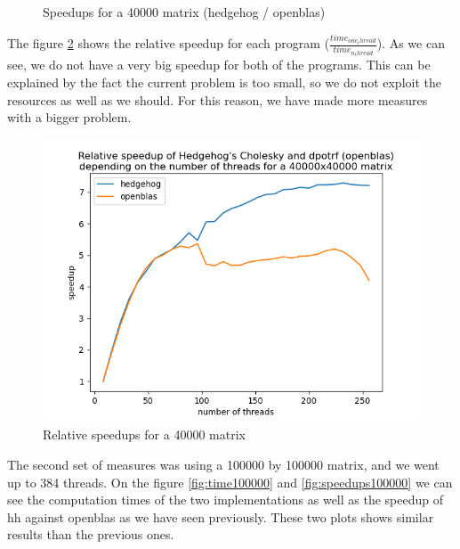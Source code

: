 \begin{figure}[!htb]
\begin{minipage}{0.48\linewidth}
    \caption{Speedups for a 40000 matrix (hedgehog / openblas)}
    \label{fig:speedups40000}
  \end{minipage}
\end{figure}

The figure \ref{fig:relativespeedup40000} shows the relative speedup for each
program ($\frac{time_{one_thread}}{time_{n_thread}}$). As we can see, we do not
have a very big speedup for both of the programs. This can be explained by the
fact the current problem is too small, so we do not exploit the resources as
well as we should. For this reason, we have made more measures with a bigger
problem.

\begin{figure}[!ht]
  \begin{center}
    \includegraphics[scale=0.8]{img/cho-img/relative-speedup-40000.png}
    \caption{Relative speedups for a 40000 matrix}
    \label{fig:relativespeedup40000}
  \end{center}
\end{figure}

The second set of measures was using a 100000 by 100000 matrix, and we went up to
384 threads. On the figure \ref{fig:time100000} and \ref{fig:speedups100000} we
can see the computation times of the two implementations as well as the speedup
of \gls{hh} against openblas as we have seen previously. These two plots shows
similar results than the previous ones.

